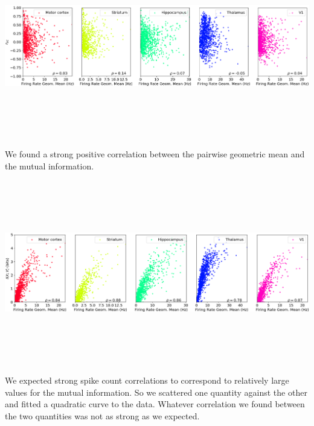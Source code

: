 \documentclass[a0,portrait]{a0poster}
\begin{document}
\begin{multicols}{2}
\includegraphics[width=\linewidth, height=8cm]{correlation_vs_geometric_mean.png}

We found a strong positive correlation between the pairwise geometric mean and the mutual information.

\includegraphics[width=\linewidth, height=8cm]{info_vs_geometric_mean.png}

We expected strong spike count correlations to correspond to relatively large values for the mutual information. So we scattered one quantity against the other and fitted a quadratic curve to the data. Whatever correlation we found between the two quantities was not as strong as we expected.


\end{multicols}
\end{document}
